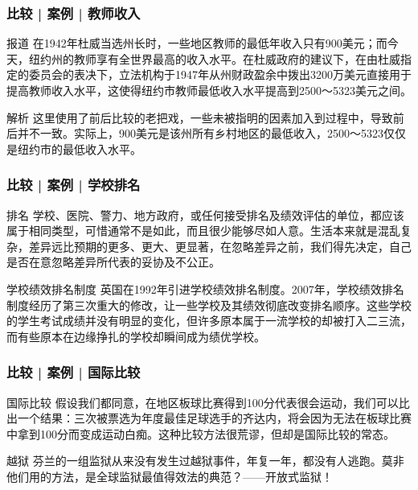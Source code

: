 \begin{frame}
  \frametitle{比较 | 案例 | 教师收入}
  \begin{block}{报道}
    在1942年杜威当选州长时，一些地区教师的最低年收入只有900美元；而今天，纽约州的教师享有全世界最高的收入水平。在杜威政府的建议下，在由杜威指定的委员会的表决下，立法机构于1947年从州财政盈余中拨出3200万美元直接用于提高教师收入水平，这使得纽约市教师最低收入水平提高到2500～5323美元之间。
  \end{block}
  \pause \pause \pause \pause
  \begin{block}{解析}
    这里使用了前后比较的老把戏，一些未被指明的因素加入到过程中，导致前后并不一致。实际上，900美元是该州所有乡村地区的最低收入，2500～5323仅仅是纽约市的最低收入水平。
  \end{block}
\end{frame}

\begin{frame}
  \frametitle{比较 | 案例 | 学校排名}
  \begin{block}{排名}
    学校、医院、警力、地方政府，或任何接受排名及绩效评估的单位，都应该属于相同类型，可惜通常不是如此，而且很少能够尽如人意。生活本来就是混乱复杂，差异远比预期的更多、更大、更显著，在忽略差异之前，我们得先决定，自己是否在意忽略差异所代表的妥协及不公正。
  \end{block}
  \pause
  \begin{block}{学校绩效排名制度}
    英国在1992年引进学校绩效排名制度。2007年，学校绩效排名制度经历了第三次重大的修改，让一些学校及其绩效彻底改变排名顺序。这些学校的学生考试成绩并没有明显的变化，但许多原本属于一流学校的却被打入二三流，而有些原本在边缘挣扎的学校却瞬间成为绩优学校。
  \end{block}
\end{frame}

\begin{frame}
  \frametitle{比较 | 案例 | 国际比较}
  \begin{block}{国际比较}
  假设我们都同意，在地区板球比赛得到100分代表很会运动，我们可以比出一个结果：三次被票选为年度最佳足球选手的齐达内，将会因为无法在板球比赛中拿到100分而变成运动白痴。这种比较方法很荒谬，但却是国际比较的常态。
  \end{block}
  \pause
  \begin{block}{越狱}
    芬兰的一组监狱从来没有发生过越狱事件，年复一年，都没有人逃跑。莫非他们用的方法，是全球监狱最值得效法的典范？——开放式监狱！
  \end{block}
\end{frame}

